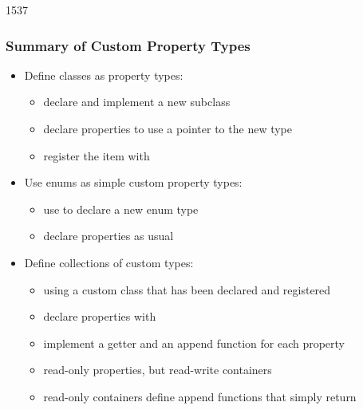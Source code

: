 \begin{slide}[fragile]{1537}\frametitle{Summary of Custom Property Types}

\begin{itemize}
\item Define classes as property types:
  \begin{itemize}
  \item declare and implement a new  subclass
  \item declare properties to use a pointer to the new type
  \item register the item with 
  \end{itemize}
\vspace*{1em}
\item Use enums as simple custom property types:
  \begin{itemize}
  \item use  to declare a new enum type
  \item declare properties as usual
  \end{itemize}
\vspace*{1em}
\item Define collections of custom types:
  \begin{itemize}
  \item using a custom class that has been declared and registered
  \item declare properties with 
  \item implement a getter and an append function for each property
  \item read-only properties, but read-write containers
  \item read-only containers define append functions that simply return
  \end{itemize}
\end{itemize}

\end{slide}

